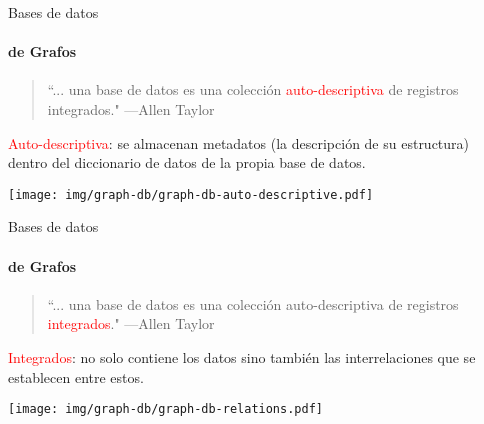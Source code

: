 \begin{frame}[fragile]{Bases de datos}
    \framesubtitle{de Grafos}

    \begin{overlayarea}{\linewidth}{\textheight}
        \begin{onlyenv}
            \begin{block}{}
            \begin{quote}
                ``... una base de datos es una colecci\'on \textcolor{red}{auto-descriptiva} de registros integrados."
                \hspace{1em plus 1fill}---Allen Taylor
            \end{quote}
    
            \textcolor{red}{Auto-descriptiva}: se almacenan metadatos (la descripci\'on de su estructura) dentro
            del diccionario de datos de la propia base de datos.
        \end{block}
      \end{onlyenv}
      
          \vspace{5mm}
\centering

      \texttt{[image: img/graph-db/graph-db-auto-descriptive.pdf]}

    \end{overlayarea}

\end{frame}



\begin{frame}[fragile]{Bases de datos}
    \framesubtitle{de Grafos}

    \begin{overlayarea}{\linewidth}{\textheight}
        \begin{onlyenv}
            \begin{block}{}
                \begin{quote}
                    ``... una base de datos es una colecci\'on auto-descriptiva de registros \textcolor{red}{integrados}."
                    \hspace{1em plus 1fill}---Allen Taylor
                \end{quote}
                \textcolor{red}{Integrados}: no solo contiene los datos sino tambi\'en las interrelaciones
                 que se establecen entre estos.
            \end{block}
      \end{onlyenv}

      \vspace{5mm}
      
      \texttt{[image: img/graph-db/graph-db-relations.pdf]}
    \end{overlayarea}
    
\end{frame}